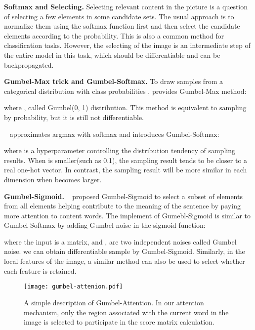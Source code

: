 \documentclass{article}
\begin{document}
\textbf{Softmax and Selecting.} Selecting relevant content in the picture is a question of selecting a few elements in some candidate sets. The usual approach is to normalize them using the softmax function first and then select the candidate elements according to the probability. This is also a common method for classification tasks. However, the selecting of the image is an intermediate step of the entire model in this task, which should be differentiable and can be backpropagated. 

\textbf{Gumbel-Max trick and Gumbel-Softmax.}  To draw samples  from a categorical distribution with class probabilities , \cite{gumbel1954statistical} provides Gumbel-Max method:



where , called Gumbel(0, 1) distribution. This method is equivalent to sampling by probability, but it is still not differentiable. 

~\cite{DBLP:conf/iclr/JangGP17} approximates argmax with softmax and introduces Gumbel-Softmax:



where  is a hyperparameter controlling the distribution tendency of sampling results. When  is smaller(such as 0.1), the sampling result tends to be closer to a real one-hot vector. In contrast, the sampling result will be more similar in each dimension when  becomes larger. 

\textbf{Gumbel-Sigmoid.} ~\cite{DBLP:conf/acl/GengWWQLT20} proposed Gumbel-Sigmoid to select a subset of elements from all elements helping contribute to the meaning of the sentence by paying more attention to content words. The implement of Gumebl-Sigmoid is similar to Gumbel-Softmax by adding Gumbel noise in the sigmoid function:


where the input  is a matrix, and ,  are two independent noises called Gumbel noise. we can obtain differentiable sample by Gumbel-Sigmoid. Similarly, in the local features of the image, a similar method can also be used to select whether each feature is retained.

\begin{figure}[t]
\centering\texttt{[image: gumbel-attenion.pdf]}
	\footnotesize\caption{A simple description of Gumbel-Attention. In our attention mechanism, only the region associated with the current word in the image is selected to participate in the score matrix calculation.} 
	\label{fig:}
\end{figure}
\end{document}
